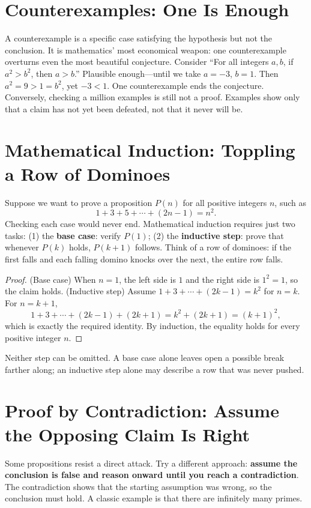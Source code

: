 \section{Counterexamples: One Is Enough}

A counterexample is a specific case satisfying the hypothesis but not the conclusion. It is mathematics' most economical weapon: one counterexample overturns even the most beautiful conjecture. Consider ``For all integers $a,b$, if $a^2>b^2$, then $a>b$.'' Plausible enough---until we take $a=-3$, $b=1$. Then $a^2=9>1=b^2$, yet $-3<1$. One counterexample ends the conjecture. Conversely, checking a million examples is still not a proof. Examples show only that a claim has not yet been defeated, not that it never will be.

\section{Mathematical Induction: Toppling a Row of Dominoes}

Suppose we want to prove a proposition $P(n)$ for all positive integers $n$, such as
\[1+3+5+\cdots+(2n-1)=n^2.\]
Checking each case would never end. Mathematical induction requires just two tasks: (1) the \textbf{base case}: verify $P(1)$; (2) the \textbf{inductive step}: prove that whenever $P(k)$ holds, $P(k+1)$ follows. Think of a row of dominoes: if the first falls and each falling domino knocks over the next, the entire row falls.

\begin{proof}
(Base case) When $n=1$, the left side is $1$ and the right side is $1^2=1$, so the claim holds.
(Inductive step) Assume $1+3+\cdots+(2k-1)=k^2$ for $n=k$. For $n=k+1$,
\[1+3+\cdots+(2k-1)+(2k+1)=k^2+(2k+1)=(k+1)^2,\]
which is exactly the required identity. By induction, the equality holds for every positive integer $n$.
\end{proof}

Neither step can be omitted. A base case alone leaves open a possible break farther along; an inductive step alone may describe a row that was never pushed.

\section{Proof by Contradiction: Assume the Opposing Claim Is Right}

Some propositions resist a direct attack. Try a different approach: \textbf{assume the conclusion is false and reason onward until you reach a contradiction}. The contradiction shows that the starting assumption was wrong, so the conclusion must hold. A classic example is that there are infinitely many primes.

